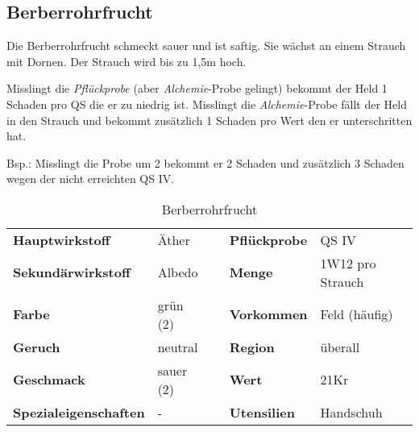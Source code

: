 \subsection{Berberrohrfrucht}
Die Berberrohrfrucht schmeckt sauer und ist saftig. Sie wächst an einem Strauch mit Dornen. Der Strauch wird bis zu 1,5m hoch. 

Misslingt die \textit{Pflückprobe} (aber \textit{Alchemie}-Probe gelingt) bekommt der Held 1 Schaden pro QS die er zu niedrig ist. Misslingt die \textit{Alchemie}-Probe fällt der Held in den Strauch und bekommt zusätzlich 1 Schaden pro Wert den er unterschritten hat. 

Bsp.: Misslingt die Probe um 2 bekommt er 2 Schaden und zusätzlich 3 Schaden wegen der nicht erreichten QS IV.

\begin{table}[h]
\begin{center}
\begin{tabular}{|l|l|p{1cm}|l|l|}
	\cline{1-2} \cline{4-5}
	\textbf{Hauptwirkstoff} & Äther && \textbf{Pflückprobe} & QS IV \\ \cline{1-2} \cline{4-5}
	\textbf{Sekundärwirkstoff} & Albedo && \textbf{Menge} & 1W12 pro Strauch \\ \cline{1-2} \cline{4-5}
	\textbf{Farbe} & grün (2) && \textbf{Vorkommen} & Feld (häufig) \\ \cline{1-2} \cline{4-5}
	\textbf{Geruch} & neutral && \textbf{Region} & überall \\ \cline{1-2} \cline{4-5}
	\textbf{Geschmack} & sauer (2) && \textbf{Wert} & 21Kr \\ \cline{1-2} \cline{4-5}
	\textbf{Spezialeigenschaften} & - && \textbf{Utensilien} & Handschuh \\ \cline{1-2} \cline{4-5}
\end{tabular}
\end{center}
\caption{Berberrohrfrucht}
\label{tab:berberrohrfrucht}
\end{table}


